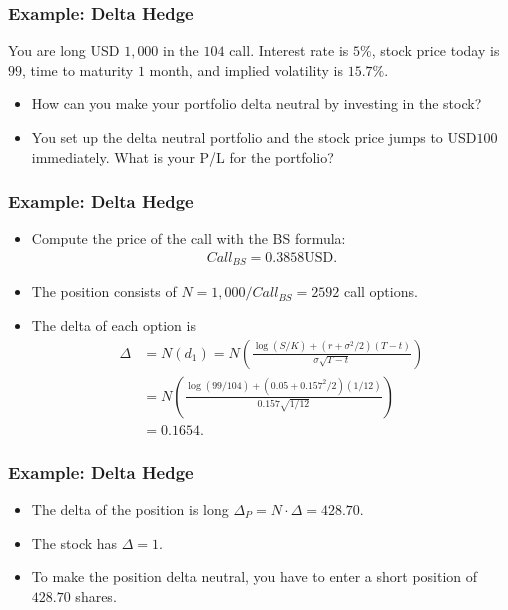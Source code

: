 \begin{frame}[fragile]
\frametitle{Example: Delta Hedge}
You are long USD $1,000$ in the $104$ call. Interest rate is $5\%$,
stock price today is $99$, time to maturity $1$ month, and implied volatility is
$15.7\%$.
\begin{itemize}
  \item How can you make your portfolio delta neutral by investing in the stock?
  \item You set up the delta neutral portfolio and the stock price jumps to
  USD$100$ immediately. What is your P/L for the portfolio?
\end{itemize}

\end{frame}

\begin{frame}[fragile]
\frametitle{Example: Delta Hedge}
\begin{itemize}
  \item Compute the price of the call with the BS formula:
  \begin{align*}
    Call_{BS} = 0.3858 \text{USD}.
  \end{align*}
  \item The position consists of $N=1,000/Call_{BS}=2592$ call options.
  \item The delta of each option is
  \begin{align*}
    \Delta &= N(d_1) =N(\frac{\log \left( S/K \right) + (r+\sigma^2/2)(T-t)
    }{\sigma\sqrt{T-t}}) \\
    	&= N(\frac{\log \left( 99/104 \right) + (0.05+0.157^2/2)(1/12)
    }{0.157\sqrt{1/12}})\\
     	&= 0.1654.
  \end{align*}
\end{itemize}
\end{frame}


\begin{frame}[fragile]
\frametitle{Example: Delta Hedge}
\begin{itemize}
  \item The delta of the position is long $\Delta_P=N\cdot \Delta=428.70$.
  \item The stock has $\Delta=1$.
  \item To make the position delta neutral, you have to enter a short position
  of $428.70$ shares.
\end{itemize}
\end{frame}

